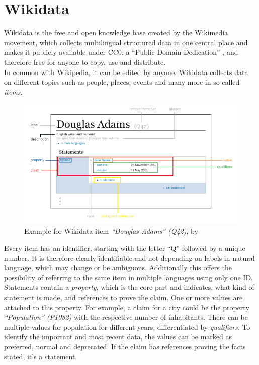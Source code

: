 \section{Wikidata}

Wikidata is the free and open knowledge base created by the Wikimedia movement, which collects multilingual structured data in one central place and makes it publicly available under CC0, a ``Public Domain Dedication'' \citep{cc0}, and therefore free for anyone to copy, use and distribute. \\
In common with Wikipedia, it can be edited by anyone. Wikidata collects data on different topics such as people, places, events and many more in so called \textit{items}.
\begin{figure}[H]
	\centering
	\includegraphics[width=\textwidth]{diagrams/Wikidata_statement.png}
	\caption{Example for Wikidata item \textit{``Douglas Adams'' (Q42)}, by \citet{kritschmar}}
	\label{diagramWikidataStatement}
\end{figure}
Every item has an identifier, starting with the letter ``Q'' followed by a unique number. It is therefore clearly identifiable and not depending on labels in natural language, which may change or be ambiguous. Additionally this offers the possibility of referring to the same item in multiple languages using only one ID. \\
Statements contain a \textit{property}, which is the core part and indicates, what kind of statement is made, and references to prove the claim. One or more values are attached to this property. For example, a claim for a city could be the property \textit{``Population'' (P1082)} with the respective number of inhabitants. There can be multiple values for population for different years, differentiated by \textit{qualifiers}. To identify the important and most recent data, the values can be marked as preferred, normal and deprecated. If the claim has references proving the facts stated, it's a statement. \\

